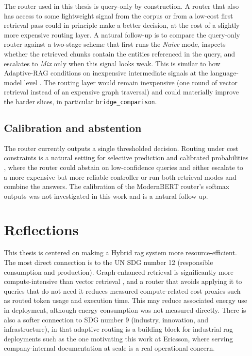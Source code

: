 \documentclass[english, bibtex]{kththesis}               %
\numberwithin{listing}{chapter}
\begin{document}
The router used in this thesis is query-only by construction. A router that also has access to some lightweight signal from the corpus or from a low-cost first retrieval pass could in principle make a better decision, at the cost of a slightly more expensive routing layer. A natural follow-up is to compare the query-only router against a two-stage scheme that first runs the \emph{Naive} mode, inspects whether the retrieved chunks contain the entities referenced in the query, and escalates to \emph{Mix} only when this signal looks weak. This is similar to how Adaptive-RAG conditions on inexpensive intermediate signals at the language-model level \cite{jeong2024adaptiverag}. The routing layer would remain inexpensive (one round of vector retrieval instead of an expensive graph traversal) and could materially improve the harder slices, in particular \texttt{bridge\_comparison}.

\subsection{Calibration and abstention}
\label{sec:limitCalibration}

The router currently outputs a single thresholded decision. Routing under cost constraints is a natural setting for selective prediction \cite{geifman2017selective} and calibrated probabilities \cite{guo2017calibration}, where the router could abstain on low-confidence queries and either escalate to a more expensive but more reliable controller or run both retrieval modes and combine the answers. The calibration of the ModernBERT router's softmax outputs was not investigated in this work and is a natural follow-up.

\section{Reflections}
\label{sec:reflections}

This thesis is centered on making a Hybrid \gls{rag} system more resource-efficient. The most direct connection is to the \gls{UN} \gls{SDG} number 12 (responsible consumption and production). Graph-enhanced retrieval is significantly more compute-intensive than vector retrieval \cite{lightrag2024,microsoft2024graphragcosts}, and a router that avoids applying it to queries that do not need it reduces measured compute-related cost proxies such as routed token usage and execution time. This may reduce associated energy use in deployment, although energy consumption was not measured directly. There is also a softer connection to \gls{SDG} number 9 (industry, innovation, and infrastructure), in that adaptive routing is a building block for industrial \gls{rag} deployments such as the one motivating this work at Ericsson, where serving company-internal documentation at scale is a real operational concern.
\end{document}
